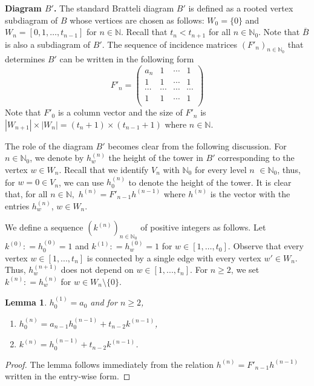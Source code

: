 \documentclass[11pt,reqno]{amsart}
\theoremstyle{definition}
\theoremstyle{remark}
\theoremstyle{plain}
\newtheorem{lemma}[definition]{Lemma}
\def\ol{\overline}
\newcommand{\N}{\mathbb N}
\numberwithin{equation}{section}
\begin{document}
\textbf{Diagram $B'$.} The standard Bratteli diagram $B'$ is defined as a rooted vertex subdiagram of $B$ whose vertices are chosen as follows: $W_0 =\{0\}$ and $W_n = [0, 1, \ldots, t_{n-1}]$ for $n \in \N$.
Recall that $t_n < t_{n+1}$ for all $n \in \N_0$.
Note that $\ol B$ is also a subdiagram of $B'$. The sequence of incidence matrices $(F'_n)_{n \in \N_0}$ that determines $B'$ can be written in the following form
$$
F'_n = \begin{pmatrix}
    a_n & 1 & \cdots & 1 \\
    1 & 1 & \cdots & 1 \\
\cdots & \cdots & \cdots  & \cdots\\
    1 & 1 & \cdots & 1 \\
\end{pmatrix} 
$$
Note that $F'_0$ is a column vector and the size of $F'_n$ is $|W_{n+1}| \times |W_n| = (t_n +1) \times (t_{n-1} +1)$ where $n \in \N$. 

The role of the diagram $B'$ becomes clear from the following discussion. For $n \in \N_0$, we denote by $h_w^{(n)}$ the height of the tower in $B'$ corresponding to the vertex $w \in W_n$. Recall that we identify $V_n$ with $\N_0$ for every level $n$ $\in \N_0$, thus, for $w =0 \in V_n$, we can use $h_0^{(n)}$ to denote the height of the tower.
It is clear that, for all $n \in \N,$ $h^{(n)} = F'_{n-1}h^{(n-1)} $ where 
$h^{(n)}$ is the vector with the entries $h_w^{(n)}$, $w \in W_n$.

We define a sequence $(k^{(n)})_{n\in \N_0}$ of positive integers as follows. Let  $k^{(0)} : = h^{(0)}_0 = 1$ and $k^{(1)} : =  h^{(0)}_w = 1$ for $w \in [1,\ldots,t_0]$. Observe that every vertex $w \in [1,..., t_{n}]$ is connected by a single edge with every vertex $w' \in W_{n}$. Thus, $h^{(n+1)}_w$ does not depend on $w \in [1,..., t_{n}]$. For $n \geq 2$, we set $k^{(n)}: = 
h^{(n)}_w$ for $w \in W_n \setminus \{0\}$.

\begin{lemma}\label{lem s5 heights B'} $h_{0}^{(1)} = a_0$ and for $n \geq 2$,  
\begin{enumerate}[label=(\alph*)]
    \item $h^{(n)}_0 = a_{n-1}h_0^{(n-1)} + t_{n-2} k^{(n-1)}$,
    \item $k^{(n)} = h^{(n-1)}_0 + t_{n-2} k^{(n-1)}$.
\end{enumerate}
\end{lemma}

\begin{proof} The lemma follows immediately from the relation  $h^{(n)} = F'_{n-1}h^{(n-1)}$ written in the entry-wise form. 
\end{proof}
\end{document}
